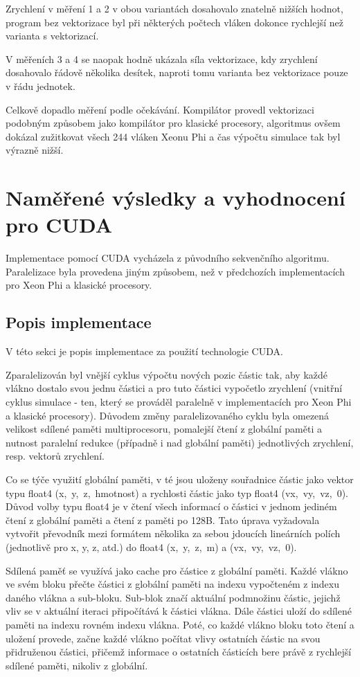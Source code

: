 \documentclass[12pt]{article}
\begin{document}
Zrychlení v měření 1 a 2 v obou variantách dosahovalo znatelně nižších hodnot,
program bez vektorizace byl při některých počtech vláken dokonce rychlejší než varianta s vektorizací.

V měřeních 3 a 4 se naopak hodně ukázala síla vektorizace, kdy zrychlení dosahovalo řádově několika desítek, naproti tomu varianta bez vektorizace pouze v řádu jednotek.

Celkově dopadlo měření podle očekávání.
Kompilátor provedl vektorizaci podobným způsobem jako kompilátor pro klasické procesory, algoritmus ovšem dokázal zužitkovat všech 244 vláken Xeonu Phi a čas výpočtu simulace tak byl výrazně nižší.

\section{Naměřené výs\-led\-ky a vyhod\-noce\-ní pro CUDA}
Implementace pomocí CUDA vycházela z původního sekvenčního algoritmu.
Paralelizace byla provedena jiným způsobem, než v předchozích implementacích pro Xeon Phi a klasické procesory.

\subsection{Popis implementace}
V této sekci je popis implementace za použití technologie CUDA.

Zparalelizován byl vnější cyklus výpočtu nových pozic částic tak,
aby každé vlákno dostalo svou jednu částici a
pro tuto částici vypočetlo zrychlení
(vnitřní cyklus simulace - ten, který se prováděl paralelně v implementacích pro Xeon Phi a klasické procesory).
Důvodem změny paralelizovaného cyklu byla omezená velikost sdílené paměti multiprocesoru,
pomalejší čtení z globální paměti a nutnost paralelní redukce (případně i nad globální paměti) jednotlivých zrychlení, resp. vektorů zrychlení.

Co se týče využití globální paměti, v té jsou uloženy souřadnice částic jako vektor typu float4 (x,~y,~z,~hmotnost) a rychlosti částic jako typ float4 (vx,~vy,~vz,~0).
Důvod volby typu float4 je v čtení všech informací o částici v jednom jediném čtení z globální paměti a čtení z paměti po 128B.
Tato úprava vyžadovala vytvořit převodník mezi formátem několika za sebou jdoucích lineárních polích (jednotlivě pro x, y, z, atd.) do float4 (x,~y,~z,~m) a (vx,~vy,~vz,~0).

Sdílená paměť se využívá jako cache pro částice z globální paměti.
Každé vlákno ve svém bloku přečte částici z globální paměti na indexu vypočteném z indexu daného vlákna a sub-bloku.
Sub-blok značí aktuální podmnožinu částic, jejichž vliv se v aktuální iteraci připočítává k částici vlákna.
Dále částici uloží do sdílené paměti na indexu rovném indexu vlákna.
Poté, co každé vlákno bloku toto čtení a uložení provede, začne každé vlákno počítat vlivy ostatních částic na svou přidruženou částici,
přičemž informace o ostatních částicích bere právě z rychlejší sdílené paměti, nikoliv z globální.
\end{document}
